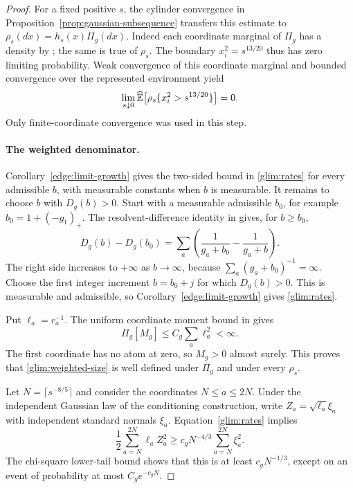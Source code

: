 \begin{proof}
For a fixed positive \(s\), the cylinder convergence in
Proposition~\ref{prop:gaussian-subsequence} transfers this estimate
to \(\rho_s(dx)=h_s(x)\Pi_g(dx)\).  Indeed each coordinate marginal
of \(\Pi_g\) has a density by
\cite[Proposition~2.3]{FUA}; the same is true of \(\rho_s\).
The boundary \(x_i^2=s^{13/20}\) thus has zero limiting probability.
Weak convergence of this coordinate marginal and bounded convergence
over the represented environment yield
\begin{equation}
 \lim_{s\downarrow0}
       \widehat{\mathbb E}\big[\rho_s\{x_i^2>s^{13/20}\}\big]=0.
 \label{glim:limit-numerator}
\end{equation}
Only finite-coordinate convergence was used in this step.

\paragraph{The weighted denominator.}
Corollary~\ref{edge:limit-growth} gives the two-sided bound in
\eqref{glim:rates} for every admissible \(b\), with measurable constants
when \(b\) is measurable.  It remains to choose \(b\) with \(D_g(b)>0\).
Start with a measurable admissible \(b_0\), for example
\(b_0=1+(-g_1)_+\).  The resolvent-difference identity in
\cite[Proposition~2.3]{FUA} gives, for \(b\ge b_0\),
\[
 D_g(b)-D_g(b_0)=
 \sum_a\left(\frac1{g_a+b_0}-\frac1{g_a+b}\right).
\]
The right side increases to \(+\infty\) as \(b\to\infty\), because
\(\sum_a(g_a+b_0)^{-1}=\infty\).  Choose the first integer
increment \(b=b_0+j\) for which \(D_g(b)>0\).  This is measurable
and admissible, so Corollary~\ref{edge:limit-growth} gives
\eqref{glim:rates}.

Put \(\ell_a=r_a^{-1}\).  The uniform coordinate moment bound in
\cite[Proposition~2.3]{FUA} gives
\[
 \Pi_g[M_g]\le C_g\sum_a\ell_a^2<\infty.
\]
The first coordinate has no atom at zero, so \(M_g>0\) almost surely.
This proves that \eqref{glim:weighted-size} is well defined under
\(\Pi_g\) and under every \(\rho_s\).

Let \(N=\lceil s^{-8/5}\rceil\) and consider the coordinates
\(N\le a\le2N\).  Under the independent Gaussian law of the
conditioning construction, write \(Z_a=\sqrt{\ell_a}\xi_a\) with
independent standard normals \(\xi_a\).  Equation~\eqref{glim:rates}
implies
\[
 \frac12\sum_{a=N}^{2N}\ell_a Z_a^2
 \ge c_gN^{-4/3}\sum_{a=N}^{2N}\xi_a^2.
\]
The chi-square lower-tail bound shows that this is at least
\(c_gN^{-1/3}\), except on an event of probability at most
\(C_g e^{-c_gN}\).


\end{proof}
